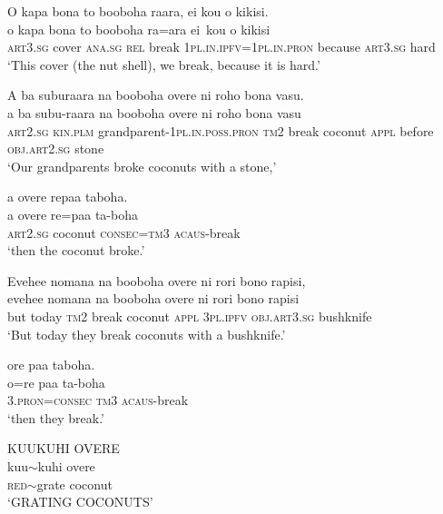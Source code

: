 \ea\label{ex:text01-68}
O kapa bona to booboha raara, ei kou o kikisi.\\
\gll o	kapa	bona	to	booboha	ra=ara	ei~kou	o	kikisi\\
     \textsc{art}3.\textsc{sg}	cover	\textsc{ana}.\textsc{sg}	\textsc{rel}	break	1\textsc{pl}.\textsc{in}.\textsc{ipfv}=1\textsc{pl}.\textsc{in}.\textsc{pron}	because	\textsc{art}3.\textsc{sg}	hard\\
\glt `This cover (the nut shell), we break, because it is hard.'
\z

\ea\label{ex:text01-69}
A ba suburaara na booboha overe ni roho bona vasu.\\
\gll a	ba	subu-raara	na	booboha	overe	ni	roho	bona	vasu\\
     \textsc{art}2.\textsc{sg}	\textsc{kin}.\textsc{plm}	grandparent-1\textsc{pl}.\textsc{in}.\textsc{poss}.\textsc{pron}	\textsc{tm}2	break	coconut	\textsc{appl}	before	\textsc{obj}.\textsc{art}2.\textsc{sg}	stone\\
\glt `Our grandparents broke coconuts with a stone,'
\z

\newpage
\ea\label{ex:text01-70}
a overe repaa taboha.\\
\gll a	overe	re=paa	ta-boha\\
     \textsc{art}2.\textsc{sg}	coconut	\textsc{consec}=\textsc{tm}3	\textsc{acaus}-break\\
\glt `then the coconut broke.'
\z

\ea\label{ex:text01-71}
Evehee nomana na booboha overe ni rori bono rapisi,\\
\gll evehee	nomana	na	booboha	overe	ni	rori	bono	rapisi\\
     but	today	\textsc{tm}2	break	coconut	\textsc{appl}	3\textsc{pl}.\textsc{ipfv}	\textsc{obj}.\textsc{art}3.\textsc{sg}	bushknife\\
\glt `But today they break coconuts with a bushknife.'
\z

\ea\label{ex:text01-72}
ore paa taboha.\\
\gll o=re	paa	ta-boha\\
     3.\textsc{pron}=\textsc{consec}	\textsc{tm}3	\textsc{acaus}-break\\
\glt `then they break.'
\z

\ea\label{ex:text01-73}
KUUKUHI OVERE\\
\gll kuu{$\sim$}kuhi	overe\\
     \textsc{red}{$\sim$}grate	coconut\\
\glt `GRATING COCONUTS'
\z

